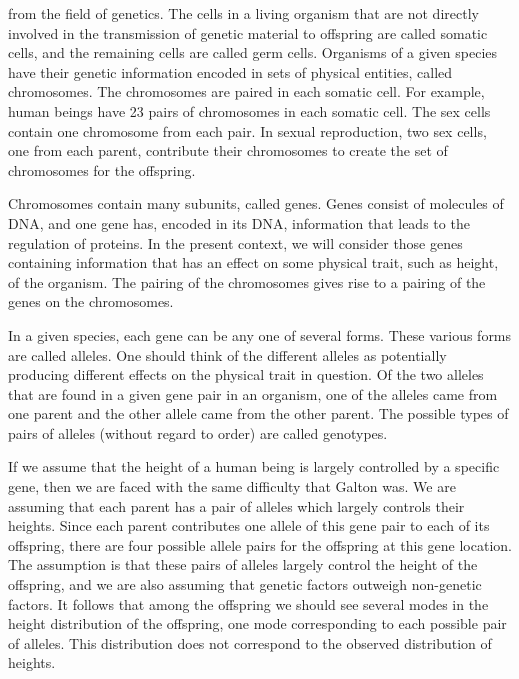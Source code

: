from the field of genetics.  The cells in a living organism that are
not directly involved in the transmission of genetic material to offspring are called somatic
cells, and the remaining cells are called germ cells.   Organisms of a given species have
their genetic information encoded in sets of physical entities, called
chromosomes.  The chromosomes are paired in each somatic cell.  For example,
human beings have 23 pairs of chromosomes in each somatic cell.  The sex cells contain one
chromosome from each pair.  In sexual reproduction, two sex cells, one from each parent,
contribute their chromosomes to create the set of chromosomes for the offspring.
\par
Chromosomes contain many subunits, called genes.  Genes consist of molecules of
DNA, and one gene has, encoded in its DNA, information that leads to the regulation of
proteins.  In the present context, we will consider those genes containing information that
has an effect on some physical trait, such as height, of the organism.  The pairing of the
chromosomes gives rise to a pairing of the genes on the chromosomes.
\par
In a given species, each gene can be any one of several forms.  These various forms are called
alleles.  One should think of the different alleles as potentially producing
different effects on the physical trait in question.  Of the two alleles that are found in a
given gene pair in an organism, one of the alleles came from one parent and the other allele came
from the other parent.  The possible types of pairs of alleles (without regard to order) are
called genotypes.
\par
If we assume that the height of a human being is largely controlled by a specific gene,
then we are faced with the same difficulty that Galton was.  We are assuming that each parent
has a pair of alleles which largely controls their heights.  Since each parent contributes one
allele of this gene pair to each of its offspring, there are four possible allele pairs for the
offspring at this gene location.  The assumption is that these pairs of alleles largely
control the height of the offspring, and we are also assuming that genetic factors outweigh
non-genetic factors.  It follows that among the offspring we should see several modes in the
height distribution of the offspring, one mode corresponding to each possible pair of alleles. 
This distribution does not correspond to the observed distribution of heights.
\par
